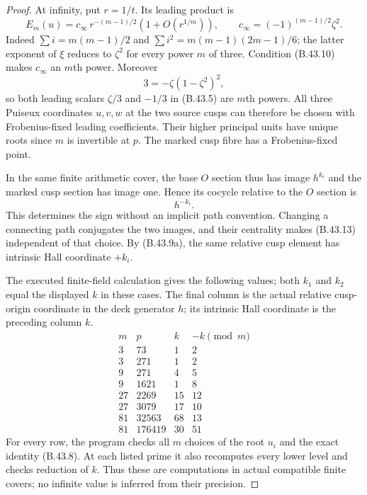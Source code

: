 \begin{proof}
At infinity, put $r=1/t$.  Its leading product is
\[
 E_m(u)=c_\infty\,r^{-(m-1)/2}
                  (1+O(r^{1/m})),\qquad
 c_\infty=(-1)^{(m-1)/2}\zeta^2.                            \tag{B.43.12}
\]
Indeed $\sum i=m(m-1)/2$ and
$\sum i^2=m(m-1)(2m-1)/6$; the latter exponent of $\xi$
reduces to $\zeta^2$ for every power $m$ of three.
Condition (B.43.10) makes $c_\infty$ an $m$th power.
Moreover
\[
 3=-\zeta(1-\zeta^2)^2,
\]
so both leading scalars $\zeta/3$ and $-1/3$ in
(B.43.5) are $m$th powers.  All three Puiseux coordinates
$u,v,w$ at the two source cusps can therefore be chosen
with Frobenius-fixed leading coefficients.  Their higher
principal units have unique roots since $m$ is invertible
at $p$.  The marked cusp fibre has a Frobenius-fixed point.

In the same finite arithmetic cover, the base $O$ section
thus has image $h^{k_i}$ and the marked cusp section has
image one.  Hence its cocycle relative to the $O$ section is
\[
                   h^{-k_i}.                              \tag{B.43.13}
\]
This determines the sign without an implicit path convention.
Changing a connecting path conjugates the two images, and
their centrality makes (B.43.13) independent of that choice.
By (B.43.9a), the same relative cusp element has intrinsic
Hall coordinate $+k_i$.

The executed finite-field calculation gives the following
values; both $k_1$ and $k_2$ equal the displayed $k$ in these
cases. The final column is the actual relative cusp-origin
coordinate in the deck generator $h$; its intrinsic Hall
coordinate is the preceding column $k$.
\[
\begin{array}{c|r|r|r}
 m&p&k&-k\pmod m\\\hline
 3&73&1&2\\
 3&271&1&2\\
 9&271&4&5\\
 9&1621&1&8\\
 27&2269&15&12\\
 27&3079&17&10\\
 81&32563&68&13\\
 81&176419&30&51
\end{array}                                                  \tag{B.43.14}
\]
For every row, the program checks all $m$ choices of the
root $u_i$ and the exact identity (B.43.8).  At each listed
prime it also recomputes every lower level and checks
reduction of $k$.  Thus these are computations in actual
compatible finite covers; no infinite value is inferred
from their precision.


\end{proof}

